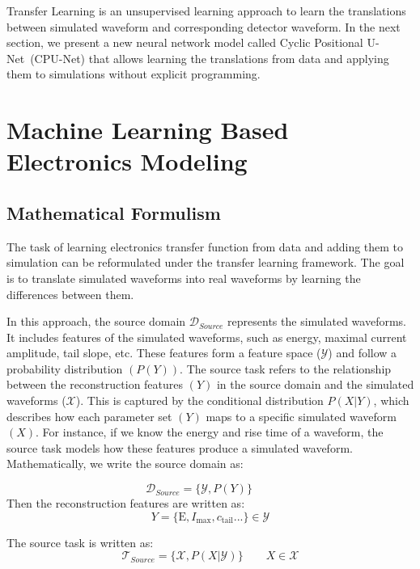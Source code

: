 Transfer Learning is an unsupervised learning approach to learn the translations between simulated waveform and corresponding detector waveform. In the next section, we present a new neural network model called Cyclic Positional U-Net~(CPU-Net) that allows learning the translations from data and applying them to simulations without explicit programming.

\section{Machine Learning Based Electronics Modeling}
\subsection{Mathematical Formulism}
The task of learning electronics transfer function from data and adding them to simulation can be reformulated under the transfer learning framework. The goal is to translate simulated waveforms into real waveforms by learning the differences between them.

In this approach, the source domain $\mathcal{D}_{Source}$ represents the simulated waveforms. It includes features of the simulated waveforms, such as energy, maximal current amplitude, tail slope, etc. These features form a feature space ($\mathcal{Y}$) and follow a probability distribution $(P(Y))$. The source task refers to the relationship between the reconstruction features $(Y)$ in the source domain and the simulated waveforms ($\mathcal{X}$). This is captured by the conditional distribution $P(X|Y)$, which describes how each parameter set $(Y)$ maps to a specific simulated waveform $(X)$. For instance, if we know the energy and rise time of a waveform, the source task models how these features produce a simulated waveform. Mathematically, we write the source domain as:

\begin{equation}
    \mathcal{D}_{Source}=\{\mathcal{Y},P(Y)\}\qquad 
    \label{eqn:source_domain}
\end{equation}
Then the reconstruction features are written as:
 \begin{equation}
     Y=\{\mathrm{E},I_{\mathrm{max}},c_{\mathrm{tail}}...\}\in \mathcal{Y}
 \end{equation}

The source task is written as:
\begin{equation}
    \mathcal{T}_{Source}=\{\mathcal{X},P(X|\mathcal{Y})\} \qquad X\in \mathcal{X}
    \label{eqn:source_task}
\end{equation}


